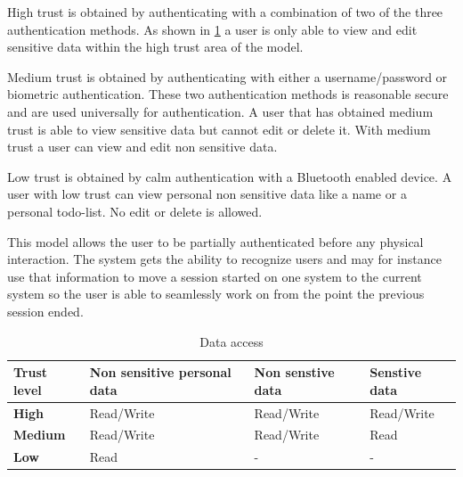 High trust is obtained by authenticating with a combination of two of the three authentication methods.
As shown in \cref{table_data_access} a user is only able to view and edit sensitive data within the high trust area of the model.

Medium trust is obtained by authenticating with either a username/password or biometric authentication.
These two authentication methods is reasonable secure and are used universally for authentication.
A user that has obtained medium trust is able to view sensitive data but cannot edit or delete it.
With medium trust a user can view and edit non sensitive data.

Low trust is obtained by calm authentication with a Bluetooth enabled device.
A user with low trust can view personal non sensitive data like a name or a personal todo-list.
No edit or delete is allowed.

This model allows the user to be partially authenticated before any physical interaction.
The system gets the ability to recognize users and may for instance use that information to move a session started on one system to the current system so the user is able to seamlessly work on from the point the previous session ended.

\begin{table}[!t]
\caption{Data access}
\label{table_data_access}
\centering
\begin{tabular}{|p{1.3cm}|p{2.0cm}|p{2.0cm}|p{2.0cm}|}
\hline
\textbf{Trust level} & \textbf{Non sensitive personal data} & \textbf{Non senstive data} & \textbf{Senstive data}\\
\hline
\textbf{High} & Read/Write & Read/Write & Read/Write\\
\hline
\textbf{Medium} & Read/Write & Read/Write & Read\\
\hline
\textbf{Low} & Read & - & -\\
\hline
\end{tabular}
\end{table}